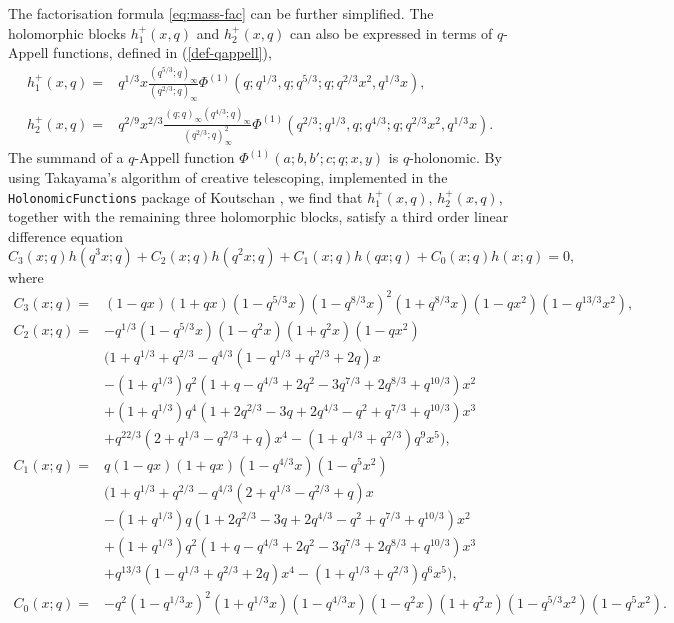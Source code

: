 \documentclass[a4paper,11pt]{article}
\theoremstyle{definition}
\newcommand{\nn}{\nonumber \\}
\begin{document}
The factorisation formula \eqref{eq:mass-fac} can be further
simplified.  The holomorphic blocks $h_1^+(x,q)$ and $h_2^+(x,q)$ can
also be expressed in terms of $q$-Appell functions, defined in (\ref{def-qappell}), 
\begin{subequations}
  \begin{align}
    h_1^+(x,q) =
    &q^{1/3}x\frac{(q^{5/3};q)_\infty}{(q^{2/3};q)_\infty}
      \Phi^{(1)}(q;q^{1/3},q;q^{5/3};q;q^{2/3}x^2,q^{1/3}x),  \\
    h_2^+(x,q) =
    &q^{2/9}x^{2/3}\frac{(q;q)_\infty(q^{4/3};q)_\infty}
      {(q^{2/3};q)_\infty^2}
      \Phi^{(1)}(q^{2/3};q^{1/3},q;q^{4/3};q;q^{2/3}x^2,q^{1/3}x).
  \end{align}
\end{subequations}
The summand of a $q$-Appell function $\Phi^{(1)}(a;b,b';c;q;x,y)$ is
$q$-holonomic. By using Takayama's algorithm
\cite{Takayama1990:grobner,Takayama1990:algo} of creative telescoping,
implemented in the \texttt{HolonomicFunctions} package of Koutschan
\cite{Koutschan:holofunctions,Koutschan}, we find that
$h_1^+(x,q)$, $h_2^+(x,q)$, together with the remaining three holomorphic
blocks, satisfy a third order linear difference equation
\begin{equation}
  C_3(x;q) h(q^3x;q) + C_2(x;q) h(q^2x;q)+C_1(x;q) h(q x;q)+C_0(x;q)
  h(x;q) = 0,
\end{equation}
where
\begin{align}
  C_3(x;q) =
  &(1- q x) (1+q x) (1-q^{5/3} x)
    (1-q^{8/3} x)^2 (1+q^{8/3} x) (1-q x^2) (1-q^{13/3} x^2),\nn
    C_2(x;q) =
  &-q^{1/3} (1-q^{5/3} x) (1-q^2 x)
    (1+q^2 x) (1-q x^2)\nn
  &\Big(1 + q^{1/3} + q^{2/3} -
    q^{4/3} (1 - q^{1/3} + q^{2/3} + 2 q) x\nn
  &- (1 + q^{1/3}) q^2
    (1 + q -  q^{4/3} + 2 q^2 - 3 q^{7/3} + 2 q^{8/3} + q^{10/3}) x^2\nn
  &+ (1 + q^{1/3}) q^4 (1 + 2 q^{2/3} - 3 q + 2 q^{4/3}
    - q^2 + q^{7/3} + q^{10/3}) x^3\nn
  &+ q^{22/3} (2 + q^{1/3} - q^{2/3} + q) x^4
    - (1 + q^{1/3} + q^{2/3}) q^9 x^5\Big),\nn
    C_1(x;q) =
  &q (1 - q x) (1 + q x) (1 - q^{4/3} x) (1 - q^5 x^2) \nn
  &\Big(
    1 + q^{1/3} + q^{2/3} - 
    q^{4/3} (2 + q^{1/3} - q^{2/3} + q) x \nn
  &- (1 + q^{1/3}) q
    (1 + 2 q^{2/3} - 3 q + 2 q^{4/3} - q^2 + q^{7/3} + q^{10/3})x^2\nn
  &+ (1 + q^{1/3}) q^2 (1 + q - q^{4/3} + 2 q^2 - 3 q^{7/3} + 2 q^{8/3} + 
    q^{10/3}) x^3 \nn
  &+ q^{13/3} (1 - q^{1/3} + q^{2/3} + 2 q) x^4
    - (1 + q^{1/3} + q^{2/3}) q^6 x^5
    \Big),\nn
    C_0(x;q) =
  &-q^2 (1 - q^{1/3} x)^2 (1 + q^{1/3} x) (1 - q^{4/3} x)
    (1 - q^2 x) (1 + q^2 x) (1 - q^{5/3} x^2) (1 - q^5 x^2).
\end{align}
\end{document}
